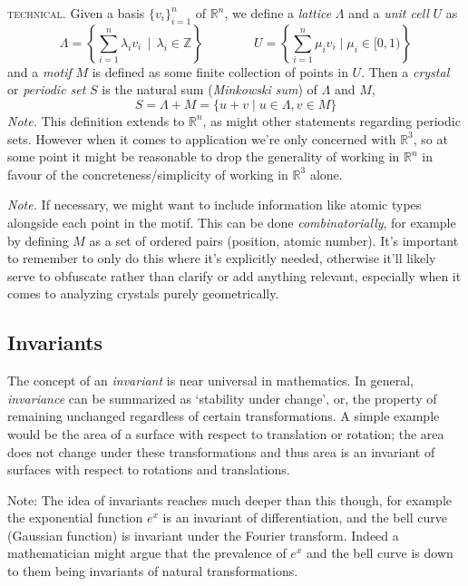 \documentclass[12pt]{article}
\begin{document}
\null

\noindent\textsc{technical.} Given a basis $\{v_i\}_{i=1}^n$ of $\mathbb{R}^n$, we define a  \emph{lattice} $\Lambda$ and a \emph{unit cell} $U$ as
\[
\Lambda = \left\{\sum_{i=1}^n \lambda_i v_i \,\mid \, \lambda_i\in\mathbb{Z}\right\} \qquad\qquad
U = \left\{\sum_{i=1}^n \mu_iv_i \mid \mu_i\in [0,1) \right\}
\]
and a \emph{motif} $M$ is defined as some finite collection of points in $U$. Then a \emph{crystal} or \emph{periodic set} $S$ is the natural sum (\emph{Minkowski sum}) of $\Lambda$ and $M$, 
\[
S = \Lambda + M = \{u+v\mid u\in \Lambda, v\in M\}
\]
\emph{Note.} This definition extends to $\mathbb{R}^n$, as might other statements regarding periodic sets. However when it comes to application we're only concerned with $\mathbb{R}^3$, so at some point it might be reasonable to drop the generality of working in $\mathbb{R}^n$ in favour of the concreteness/simplicity of working in $\mathbb{R}^3$ alone.

\noindent\emph{Note. }If necessary, we might want to include information like atomic types alongside each point in the motif. This can be done \emph{combinatorially}, for example by defining $M$ as a set of ordered pairs (position, atomic number). It's important to remember to only do this where it's explicitly needed, otherwise it'll likely serve to obfuscate rather than clarify or add anything relevant, especially when it comes to analyzing crystals purely geometrically.

\subsection{Invariants}

The concept of an \emph{invariant} is near universal in mathematics. In general, \emph{invariance} can be summarized as `stability under change', or, the property of remaining unchanged regardless of certain transformations. A simple example would be the area of a surface with respect to translation or rotation; the area does not change under these transformations and thus area is an invariant of surfaces with respect to rotations and translations. 

Note: The idea of invariants reaches much deeper than this though, for example the exponential function $e^x$ is an invariant of differentiation, and the bell curve (Gaussian function) is invariant under the Fourier transform. Indeed a mathematician might argue that the prevalence of $e^x$ and the bell curve is down to them being invariants of natural transformations. 
\end{document}
